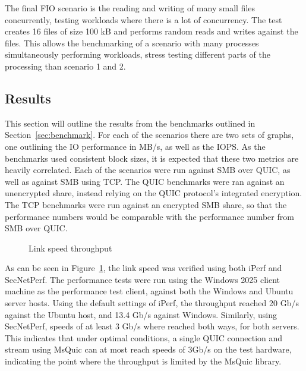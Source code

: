 \documentclass[english, 12pt, a4paper, elec, utf8, a-2b, online]{aaltothesis}
\begin{document}
The final FIO scenario is the reading and writing of many small files concurrently,
testing workloads where there is a lot of concurrency. The test creates 16 files
of size 100 kB and performs random reads and writes against the files. This allows the benchmarking
of a scenario with many processes simultaneously performing workloads, stress
testing different parts of the processing than scenario 1 and 2.

\subsection{Results}

This section will outline the results from the benchmarks outlined in Section~\ref{sec:benchmark}.
For each of the scenarios there are two sets of graphs, one outlining the IO performance
in MB/s, as well as the IOPS. As the benchmarks used consistent block sizes, it is
expected that these two metrics are heavily correlated. Each of the scenarios were
run against SMB over QUIC,
as well as against SMB using TCP. The QUIC benchmarks were ran against an unencrypted
share, instead relying on the QUIC protocol's integrated encryption. The TCP benchmarks
were run against an encrypted SMB share, so that the performance numbers would be
comparable with the performance number from SMB over QUIC.
\begin{figure}[h]
\centering
{}
\caption{Link speed throughput}
\label{fig:perf_graph}
\end{figure}

As can be seen in Figure~\ref{fig:perf_graph}, the link speed was verified using both
iPerf and SecNetPerf. The performance tests were run using the Windows 2025 client
machine as the performance test client, against both the Windows and Ubuntu
server hosts. Using the default settings of iPerf, the throughput reached 20 Gb/s
against the Ubuntu host, and 13.4 Gb/s against Windows. Similarly, using SecNetPerf,
speeds of at least 3 Gb/s where reached both ways, for both servers. This indicates
that under optimal conditions, a single QUIC connection and stream using MsQuic can at most reach
speeds of 3Gb/s on the test hardware, indicating the point where the throughput is limited by the MsQuic
library.
\end{document}
